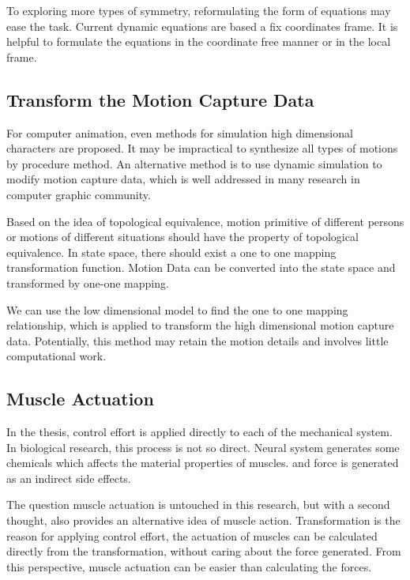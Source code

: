 To exploring more types of symmetry, reformulating the form of equations may ease the task.
Current dynamic equations are based a fix coordinates frame.
It is helpful to formulate the equations in the coordinate free manner or in the local frame.






\subsection{Transform the Motion Capture Data}
For computer animation, even methods for simulation high dimensional characters are proposed.
It may be impractical to synthesize all types of motions by procedure method.
An alternative method is to use dynamic simulation to modify motion capture data, which is well addressed in many research in computer graphic community.



Based on the idea of topological equivalence, 
motion primitive of different persons or motions of different situations should have the property of topological equivalence.
In state space, there should exist a one to one mapping transformation function.
Motion Data can be converted into the state space and  transformed by one-one mapping.


We can use the low dimensional model to find the one to one mapping relationship, 
which is applied to transform the high dimensional motion capture data.
Potentially, this method may retain the motion details and involves little computational work. 





\subsection{Muscle Actuation}
In the thesis, control effort is applied directly to each \dof of the mechanical system.
In biological research, this process is not so direct.
Neural system generates some chemicals which affects the material properties of muscles.
and force is generated as an indirect side effects.


The question muscle actuation is untouched in this research,
but with a second thought, \moit also provides an alternative idea of muscle action.
Transformation is the reason for applying control effort,
the actuation of muscles can be calculated directly from the transformation, without caring about the force generated.
From this perspective, muscle actuation can be easier than calculating the forces.


